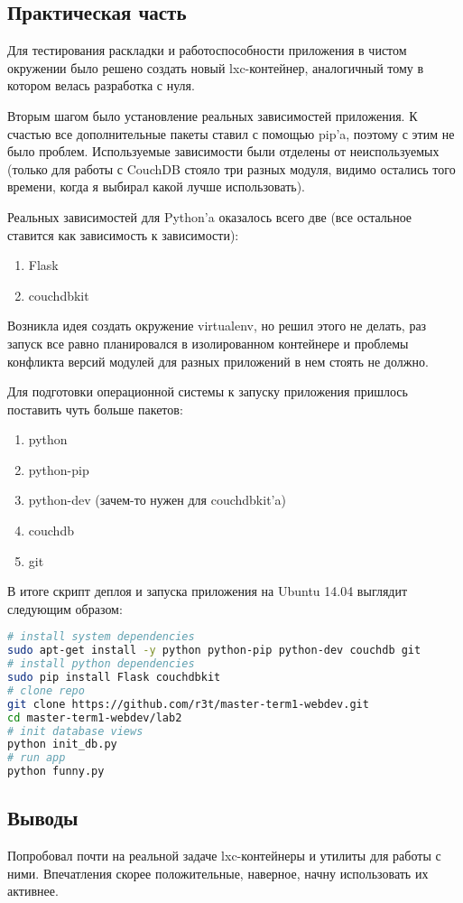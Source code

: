 \documentclass[14pt, a4paper]{extreport}
\begin{document}
\subsection*{Практическая часть}
Для тестирования раскладки и работоспособности приложения в чистом окружении
было решено создать новый lxc-контейнер, аналогичный тому в котором
велась разработка с нуля.

Вторым шагом было установление реальных зависимостей приложения. К счастью все дополнительные
пакеты ставил с помощью pip'a, поэтому с этим не было проблем. Используемые зависимости
были отделены от неиспользуемых (только для работы с CouchDB стояло три разных модуля, видимо 
остались того времени, когда я выбирал какой лучше использовать).

Реальных зависимостей для Python'a оказалось всего две (все остальное ставится как зависимость
к зависимости):
\begin{enumerate}
\item Flask
\item couchdbkit
\end{enumerate}

Возникла идея создать окружение virtualenv, но решил этого не делать, раз запуск
все равно планировался в изолированном контейнере и проблемы конфликта версий
модулей для разных приложений в нем стоять не должно.

Для подготовки операционной системы к запуску приложения пришлось поставить чуть больше
пакетов:
\begin{enumerate}
\item python
\item python-pip
\item python-dev (зачем-то нужен для couchdbkit'a)
\item couchdb
\item git
\end{enumerate}

В итоге скрипт деплоя и запуска приложения на Ubuntu 14.04 выглядит следующим
образом:
\begin{lstlisting}[language=Bash]
# install system dependencies
sudo apt-get install -y python python-pip python-dev couchdb git
# install python dependencies
sudo pip install Flask couchdbkit
# clone repo
git clone https://github.com/r3t/master-term1-webdev.git
cd master-term1-webdev/lab2
# init database views
python init_db.py
# run app
python funny.py
\end{lstlisting}


\subsection*{Выводы}
Попробовал почти на реальной задаче lxc-контейнеры и утилиты для работы с ними.
Впечатления скорее положительные, наверное, начну использовать их активнее.
\end{document}
